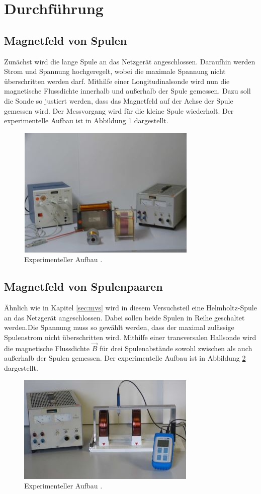 \section{Durchführung}

\subsection{Magnetfeld von Spulen \label{sec:mvs}}
Zunächst wird die lange Spule an das Netzgerät angeschlossen. Daraufhin werden
Strom und Spannung hochgeregelt, wobei die maximale Spannung nicht überschritten werden darf.
Mithilfe einer Longitudinalsonde wird nun die magnetische Flussdichte innerhalb und außerhalb der Spule gemessen.
Dazu soll die Sonde so justiert werden, dass das Magnetfeld auf der Achse der Spule gemessen wird.
Der Messvorgang wird für die kleine Spule wiederholt.
Der experimentelle Aufbau ist in Abbildung \ref{A1} dargestellt.
\begin{figure}
  \centering
  \includegraphics{Text/Bilder/Aufbau1.jpg}
  \caption{Experimenteller Aufbau \cite[4]{sample}.}
  \label{A1}
\end{figure}

\subsection{Magnetfeld von Spulenpaaren}
Ähnlich wie in Kapitel \ref{sec:mvs} wird in diesem Versuchsteil eine Helmholtz-Spule an das Netzgerät angeschlossen.
Dabei sollen beide Spulen in Reihe geschaltet werden.Die Spannung muss so gewählt werden, dass der maximal zulässige Spulenstrom
nicht überschritten wird.
Mithilfe einer transversalen Hallsonde wird die magnetische Flussdichte $\vec{B}$
für drei Spulenabstände sowohl zwischen als auch außerhalb
der Spulen gemessen.
Der experimentelle Aufbau ist in Abbildung \ref{A2} dargestellt.
\begin{figure}
  \centering
  \includegraphics{Text/Bilder/Aufbau2.jpg}
  \caption{Experimenteller Aufbau \cite[5]{sample}.}
  \label{A2}
\end{figure}

